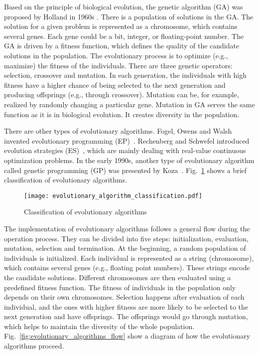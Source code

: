 Based on the principle of biological evolution, the genetic algorithm (GA) was proposed by Holland in 1960s \cite{Halland_1992}. There is a population of solutions in the GA. The solution for a given problem is represented as a chromosome, which contains several genes. Each gene could be a bit, integer, or floating-point number. The GA is driven by a fitness function, which defines the quality of the candidate solutions in the population. The evolutionary process is to optimize (e.g., maximize) the fitness of the individuals. There are three genetic operators: selection, crossover and mutation.  In each generation, the individuals with high fitness have a higher chance of being selected to the next generation and producing offsprings (e.g., through crossover). Mutation can be, for example, realized by randomly changing a particular gene. Mutation in GA serves the same function as it is in biological evolution. It creates diversity in the population. 

There are other types of evolutionary algorithms. Fogel, Owens and Walsh invented evolutionary programming (EP)~\cite{Fogel1966}. Rechenberg and Schwefel introduced evolution strategies (ES)~\cite{Rechenberg1994, Schwefel1995}, which are mainly dealing with real-value continuous optimization problems. In the early 1990s, another type of evolutionary algorithm called genetic programming (GP) was presented by Koza~\cite{Koza1992}. Fig.~\ref{fig:evolutionary_algorithm_classification} shows a brief classification of evolutionary algorithms. 

\begin{figure}[htbp]
  \centering
  \texttt{[image: evolutionary\_algorithm\_classification.pdf]}
  \caption{Classification of evolutionary algorithms}
  \label{fig:evolutionary_algorithm_classification}
\end{figure}

The implementation of evolutionary algorithms follows a general flow during the operation process. They can be divided into five steps: initialization, evaluation, mutation, selection and termination. At the beginning, a random population of individuals is initialized. Each individual is represented as a string (chromosome), which contains several genes (e.g., floating point numbers). These strings encode the candidate solutions. Different chromosomes are then evaluated using a predefined fitness function. The fitness of individuals in the population only depends on their own chromosomes. Selection happens after evaluation of each individual, and the ones with higher fitness are more likely to be selected to the next generation and have offsprings. The offsprings would go through mutation, which helps to maintain the diversity of the whole population.  Fig.~\ref{fig:evolutionary_algorithms_flow} show a diagram of how the evolutionary algorithms proceed. 

